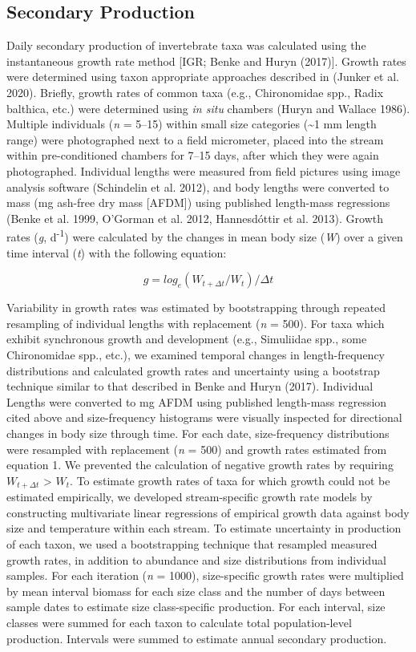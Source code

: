 \documentclass[
]{article}
\begin{document}
\hypertarget{secondary-production}{%
\subsection{Secondary Production}\label{secondary-production}}

Daily secondary production of invertebrate taxa was calculated using the
instantaneous growth rate method {[}IGR; Benke and Huryn (2017){]}.
Growth rates were determined using taxon appropriate approaches
described in (Junker et al. 2020). Briefly, growth rates of common taxa
(e.g., Chironomidae spp., Radix balthica, etc.) were determined using
\emph{in situ} chambers (Huryn and Wallace 1986). Multiple individuals
(\emph{n} = 5--15) within small size categories (\textasciitilde1 mm
length range) were photographed next to a field micrometer, placed into
the stream within pre-conditioned chambers for 7--15 days, after which
they were again photographed. Individual lengths were measured from
field pictures using image analysis software (Schindelin et al. 2012),
and body lengths were converted to mass (mg ash-free dry mass
{[}AFDM{]}) using published length-mass regressions (Benke et al. 1999,
O'Gorman et al. 2012, Hannesdóttir et al. 2013). Growth rates (\emph{g},
d\textsuperscript{-1}) were calculated by the changes in mean body size
(\emph{W}) over a given time interval (\emph{t}) with the following
equation:

\[g = log_e ( W_{t+\Delta t} / W_t) / \Delta t\]

Variability in growth rates was estimated by bootstrapping through
repeated resampling of individual lengths with replacement (\emph{n} =
500). For taxa which exhibit synchronous growth and development (e.g.,
Simuliidae spp., some Chironomidae spp., etc.), we examined temporal
changes in length-frequency distributions and calculated growth rates
and uncertainty using a bootstrap technique similar to that described in
Benke and Huryn (2017). Individual Lengths were converted to mg AFDM
using published length-mass regression cited above and size-frequency
histograms were visually inspected for directional changes in body size
through time. For each date, size-frequency distributions were resampled
with replacement (\emph{n} = 500) and growth rates estimated from
equation 1. We prevented the calculation of negative growth rates by
requiring \(W_{t + \Delta t}\) \textgreater{} \(W_t\). To estimate
growth rates of taxa for which growth could not be estimated
empirically, we developed stream-specific growth rate models by
constructing multivariate linear regressions of empirical growth data
against body size and temperature within each stream. To estimate
uncertainty in production of each taxon, we used a bootstrapping
technique that resampled measured growth rates, in addition to abundance
and size distributions from individual samples. For each iteration
(\emph{n} = 1000), size-specific growth rates were multiplied by mean
interval biomass for each size class and the number of days between
sample dates to estimate size class-specific production. For each
interval, size classes were summed for each taxon to calculate total
population-level production. Intervals were summed to estimate annual
secondary production.
\end{document}
